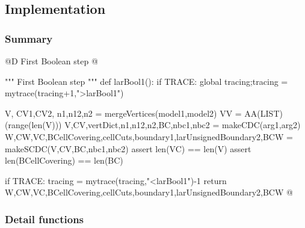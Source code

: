 \documentclass[11pt,oneside]{article}	%
\begin{document}
\subsection{Implementation}


\subsubsection{Summary}

@D First Boolean step
@{""" First Boolean step """
def larBool1():
	if TRACE: global tracing;tracing = mytrace(tracing+1,">larBool1")

	V, CV1,CV2, n1,n12,n2 = mergeVertices(model1,model2)
	VV = AA(LIST)(range(len(V)))
	V,CV,vertDict,n1,n12,n2,BC,nbc1,nbc2 = makeCDC(arg1,arg2)
	W,CW,VC,BCellCovering,cellCuts,boundary1,larUnsignedBoundary2,BCW = makeSCDC(V,CV,BC,nbc1,nbc2)
	assert len(VC) == len(V) 
	assert len(BCellCovering) == len(BC)

	if TRACE: tracing = mytrace(tracing,"<larBool1")-1
	return W,CW,VC,BCellCovering,cellCuts,boundary1,larUnsignedBoundary2,BCW 
@}

\subsubsection{Detail functions}
\end{document}
